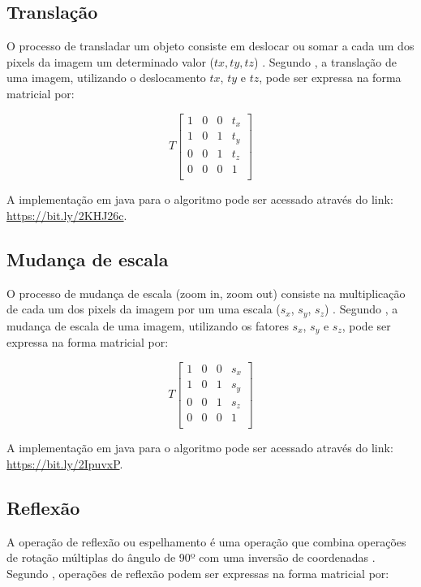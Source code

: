 \documentclass[
	12pt,				%
	oneside,			%
	a4paper,			%
	english,			%
	french,				%
	spanish,			%
	brazil,				%
	]{abntex2}
\begin{document}
\subsection{Translação}

O processo de transladar um objeto consiste em deslocar ou somar a cada um dos pixels da imagem um determinado valor (\(tx, ty, tz\)) \cite{conciAzevedoLeta:2008}. Segundo \citet{pedriniSchwartz:2008}, a translação de uma imagem, utilizando o deslocamento \(tx\), \(ty\) e \(tz\), pode ser expressa na forma matricial por:

\[
T
\begin{bmatrix}
    1 & 0 & 0 & t_x   \\ 
    1 & 0 & 1 & t_y   \\    
    0 & 0 & 1 & t_z   \\    
    0 & 0 & 0 & 1   \\  
\end{bmatrix} 
\]

A implementação em java para o algoritmo pode ser acessado através do link: \url{https://bit.ly/2KHJ26c}.

\subsection{Mudança de escala}

O processo de mudança de escala (zoom in, zoom out) consiste na multiplicação de cada um dos pixels da imagem por um uma escala (\(s_x\), \(s_y\), \(s_z\))  \cite{conciAzevedoLeta:2008}. Segundo \citet{pedriniSchwartz:2008}, a mudança de escala de uma imagem, utilizando os fatores \(s_x\), \(s_y\) e \(s_z\), pode ser expressa na forma matricial por:

\[
T
\begin{bmatrix}
    1 & 0 & 0 & s_x   \\ 
	1 & 0 & 1 & s_y   \\ 
	0 & 0 & 1 & s_z   \\ 
	0 & 0 & 0 & 1     \\ 
\end{bmatrix} 
\]

A implementação em java para o algoritmo pode ser acessado através do link: \url{https://bit.ly/2IpuvxP}.

\subsection{Reflexão}

A operação de reflexão ou espelhamento é uma operação que combina operações de rotação múltiplas do ângulo de 90º com uma inversão de coordenadas \cite{conciAzevedoLeta:2008}. Segundo \citet{pedriniSchwartz:2008}, operações de reflexão podem ser expressas na forma matricial por:
\end{document}
